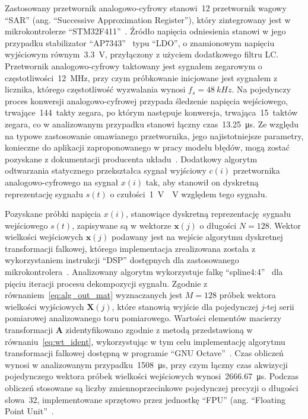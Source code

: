 Zastosowany przetwornik analogowo-cyfrowy stanowi~\qty{12}{\bitOwy} przetwornik wagowy \enquote{SAR} (ang. \enquote{Successive Approximation Register}), który zintegrowany jest w mikrokontrolerze \enquote{STM32F411}~\cite{stm_f411}. Źródło napięcia odniesienia stanowi w jego przypadku stabilizator \enquote{AP7343}~\cite{diodes_manual} typu \enquote{LDO}, o znamionowym napięciu wyjściowym równym~\qty{3.3}{V}, przyłączony z użyciem dodatkowego filtru LC. Przetwornik analogowo-cyfrowy taktowany jest sygnałem zegarowym o częstotliwości~\qty{12}{MHz}, przy czym próbkowanie inicjowane jest sygnałem z licznika, którego częstotliwość wyzwalania wynosi $f_{s} = \qty{48}{kHz}$. Na pojedynczy proces konwersji analogowo-cyfrowej przypada śledzenie napięcia wejściowego, trwające~\qty{144}{takty} zegara, po którym następuje konwersja, trwająca~\qty{15}{taktów} zegara, co w analizowanym przypadku stanowi łączny czas~\qty{13.25}{\micro s}. Ze względu na typowe zastosowanie omawianego przetwornika, jego najistotniejsze parametry, konieczne do aplikacji zaproponowanego w pracy modelu błędów, mogą zostać pozyskane z dokumentacji producenta układu~\cite{stm_f411}. Dodatkowy algorytm odtwarzania statycznego przekształca sygnał wyjściowy $c(i)$ przetwornika analogowo-cyfrowego na sygnał $x(i)$ tak, aby stanowił on dyskretną reprezentację sygnału $s(t)$ o czułości~\qty{1}{V \per V} względem tego sygnału.

Pozyskane próbki napięcia $x(i)$, stanowiące dyskretną reprezentację sygnału wejściowego $s(t)$, zapisywane są w wektorze $\mathbf{x}(j)$ o długości $N = 128$. Wektor wielkości wejściowych $\mathbf{x}(j)$ podawany jest na wejście algorytmu dyskretnej transformacji falkowej, którego implementacja zrealizowana została z wykorzystaniem instrukcji \enquote{DSP} dostępnych dla zastosowanego mikrokontrolera~\cite{cortex_dsp, reay_dsp}. Analizowany algorytm wykorzystuje falkę \enquote{spline4:4}~\cite{wang_splinebasics} dla pięciu iteracji procesu dekompozycji sygnału. Zgodnie z równaniem~\eqref{eq:alg_out_mat} wyznaczanych jest $M = 128$ próbek wektora wielkości wyjściowych $\mathbf{X}(j)$, które stanowią wyjście dla pojedynczej $j$-tej serii pomiarowej analizowanego toru pomiarowego. Wartości elementów macierzy transformacji $\mathbf{A}$ zidentyfikowano zgodnie z metodą przedstawioną w równaniu~\eqref{eq:wt_ident}, wykorzystując w tym celu implementację algorytmu transformacji falkowej dostępną w programie \enquote{GNU Octave}~\cite{pruuvsa_dwt}. Czas obliczeń wynosi w analizowanym przypadku~\qty{1508}{\micro s}, przy czym łączny czas akwizycji pojedynczego wektora próbek wielkości wejściowych wynosi~\qty{2666.67}{\micro s}. Podczas obliczeń stosowane są liczby zmiennoprzecinkowe pojedynczej precyzji o długości słowa~\qty{32}{\bitOw}, implementowane sprzętowo przez jednostkę \enquote{FPU} (ang. \enquote{Floating Point Unit}~\cite{cortex_fpu, gcc_manual}.

